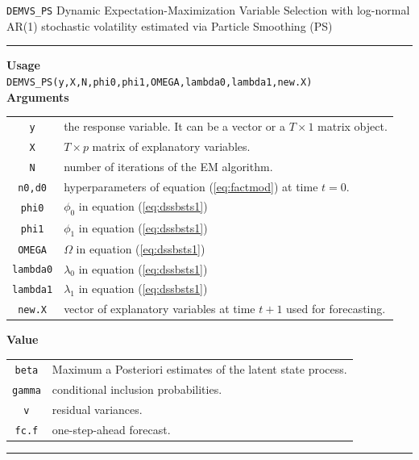 \documentclass[
  12pt,
]{book}
\theoremstyle{break}
\theoremstyle{nonumberplain}
\begin{document}
\texttt{DEMVS\_PS} Dynamic Expectation-Maximization Variable Selection
with log-normal AR(1) stochastic volatility estimated via Particle
Smoothing (PS) \vspace{1em}

\hrule
\vspace{1em}

\textbf{Usage}\\
\texttt{DEMVS\_PS(y,X,N,phi0,phi1,OMEGA,lambda0,lambda1,new.X)}\\
\textbf{Arguments}

\begin{small}
\begin{longtable}{ c l }
\texttt{y} &  the response variable. It can be a vector or a $T\times1$ matrix object. \\
\texttt{X} &  $T \times p$ matrix of explanatory variables.\\
\texttt{N} &  number of iterations of the EM algorithm. \\
\texttt{n0,d0} & hyperparameters of equation (\ref{eq:factmod}) at time $t=0$.\\
\texttt{phi0} & $\phi_{0}$ in equation (\ref{eq:dssbsts1})\\
\texttt{phi1} &  $\phi_1$ in equation (\ref{eq:dssbsts1})\\
\texttt{OMEGA} &  $\Omega$ in equation (\ref{eq:dssbsts1})\\
\texttt{lambda0} &  $\lambda_0$ in equation (\ref{eq:dssbsts1})\\
\texttt{lambda1} &  $\lambda_1$ in equation (\ref{eq:dssbsts1})\\
\texttt{new.X} &  vector of explanatory variables at time $t+1$ used for forecasting.
\end{longtable}
\end{small}

\textbf{Value}

\begin{small}
\begin{longtable}{ c l }
\texttt{beta} & Maximum a Posteriori estimates of the latent state process. \\
\texttt{gamma} &  conditional inclusion probabilities.\\
\texttt{v} &  residual variances.\\
\texttt{fc.f} & one-step-ahead forecast.
\end{longtable}
\end{small}
\hrule
\vspace{0.5em}
\end{document}
